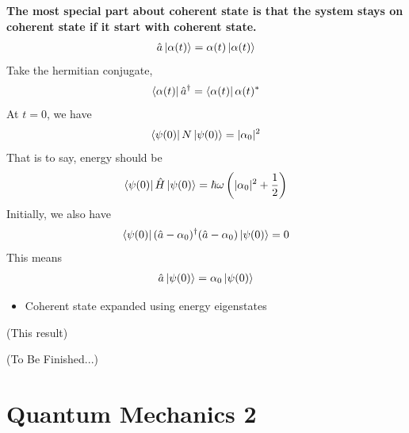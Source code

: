 \documentclass[letterpaper,10pt,english]{sphinxmanual}
\newcommand{\bra}[1]{\left\langle #1\right|}
\newcommand{\ket}[1]{\left| #1\right\rangle}
\begin{document}
\textbf{The most special part about coherent state is that the system stays on coherent state if it start with coherent state.}
\begin{gather}
\begin{split}\hat a \ket{\alpha(t)} = \alpha(t) \ket{\alpha(t)}\end{split}\notag
\end{gather}
Take the hermitian conjugate,
\begin{gather}
\begin{split}\bra{\alpha(t)} \hat a^\dagger  = \bra{\alpha(t)}\alpha(t)^*\end{split}\notag
\end{gather}
At \(t=0\), we have
\begin{gather}
\begin{split}\bra{\psi(0)} N \ket{\psi(0)} = \vert \alpha_0 \vert ^2\end{split}\notag
\end{gather}
That is to say, energy should be
\begin{gather}
\begin{split}\bra{\psi(0)} \hat H \ket{\psi(0)} = \hbar \omega \left( \vert \alpha_0 \vert^2 + \frac{1}{2} \right)\end{split}\notag
\end{gather}
Initially, we also have
\begin{gather}
\begin{split}\bra{\psi(0)} (\hat a - \alpha_0)^\dagger (\hat a-\alpha_0) \ket{\psi(0)} = 0\end{split}\notag
\end{gather}
This means
\begin{gather}
\begin{split}\hat a \ket{\psi(0)} = \alpha_0 \ket{\psi(0)}\end{split}\notag
\end{gather}\begin{itemize}
\item {} 
Coherent state expanded using energy eigenstates

\end{itemize}

(This result)

(To Be Finished...)


\section{Quantum Mechanics 2}
\label{Quantum/QuantumMechanics2:quantum-mechanics-2}\label{Quantum/QuantumMechanics2::doc}
\end{document}
